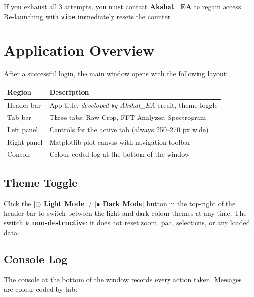 \documentclass[12pt, a4paper]{article}
\newcommand{\btn}[1]{%
  \textbf{\color{accentdark}[#1]}%
}
\begin{document}
\begin{warnbox}
If you exhaust all 3 attempts, you must contact \textbf{Akshat\_EA} to
regain access.  Re-launching with \texttt{vibe} immediately resets the
counter.
\end{warnbox}

\section{Application Overview}

After a successful login, the main window opens with the following layout:

\begin{center}
\begin{tabular}{ll}
\toprule
\textbf{Region} & \textbf{Description}\\
\midrule
Header bar    & App title, \textit{developed by Akshat\_EA} credit, theme toggle \\
Tab bar       & Three tabs: Raw Crop, FFT Analyzer, Spectrogram \\
Left panel    & Controls for the active tab (always 250--270 px wide) \\
Right panel   & Matplotlib plot canvas with navigation toolbar \\
Console       & Colour-coded log at the bottom of the window \\
\bottomrule
\end{tabular}
\end{center}

\subsection{Theme Toggle}

Click the \btn{$\odot$ Light Mode} / \btn{$\bullet$ Dark Mode} button in
the top-right of the header bar to switch between the light and dark
colour themes at any time.  The switch is \textbf{non-destructive}: it
does not reset zoom, pan, selections, or any loaded data.

\subsection{Console Log}

The console at the bottom of the window records every action taken.
Messages are colour-coded by tab:
\end{document}
